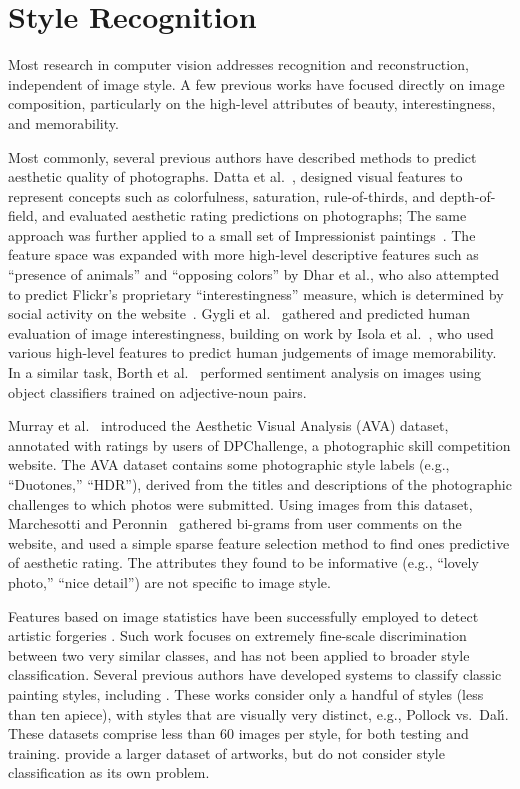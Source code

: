 \section{Style Recognition}

Most research in computer vision addresses recognition and reconstruction, independent of image style.
A few previous works have focused directly on image composition, particularly on the high-level attributes of beauty, interestingness, and memorability.

Most commonly, several previous authors have described methods to predict aesthetic quality of photographs.
Datta et al.~\parencite{Datta-ECCV-2006}, designed visual features to represent concepts such as colorfulness, saturation, rule-of-thirds, and depth-of-field, and evaluated aesthetic rating predictions on photographs; The same approach was further applied to a small set of Impressionist paintings~\parencite{Li-SP-2009}.
The feature space was expanded with more high-level descriptive features such as ``presence of animals'' and ``opposing colors'' by Dhar et al., who also attempted to predict Flickr's proprietary ``interestingness'' measure, which is determined by social activity on the website~\parencite{Dhar-CVPR-2011}.
Gygli et al.~\parencite{Gygli-ICCV-2013} gathered and predicted human evaluation of image interestingness, building on work by Isola et al.~\parencite{Isola-CVPR-2011}, who used various high-level features to predict human judgements of image memorability.
In a similar task, Borth et al.~\parencite{Borth-MM-2013} performed sentiment analysis on images using object classifiers trained on adjective-noun pairs.

Murray et al.~\parencite{Murray-CVPR-2012} introduced the Aesthetic Visual Analysis (AVA) dataset, annotated with ratings by users of DPChallenge, a photographic skill competition website.
The AVA dataset contains some photographic style labels (e.g., ``Duotones,'' ``HDR''), derived from the titles and descriptions of the photographic challenges to which photos were submitted.
Using images from this dataset, Marchesotti and Peronnin~\parencite{Marchesotti-BMVC-2013} gathered bi-grams from user comments on the website, and used a simple sparse feature selection method to find ones predictive of aesthetic rating.
The attributes they found to be informative (e.g., ``lovely photo,'' ``nice detail'') are not specific to image style.

Features based on image statistics have been successfully employed to detect artistic forgeries \parencite{Lyu-PNAS-2004}.
Such work focuses on extremely fine-scale discrimination between two very similar classes, and has not been applied to broader style classification.
Several previous authors have developed systems to classify classic painting styles, including \parencite{keren2002,shamir2010}.
These works consider only a handful of styles (less than ten apiece), with styles that are visually very distinct, e.g., Pollock vs.~Dal\'{\i}.
These datasets comprise less than 60 images per style, for both testing and training.
\cite{Mensink2014} provide a larger dataset of artworks, but do not consider style classification as its own problem.

